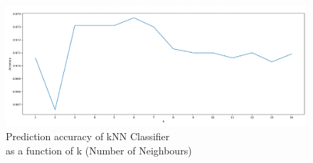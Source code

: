 \lipsum[1-1]

\begin{figure}[H]
    \centering
    \includegraphics[width=\textwidth]{images/knn.png}
    \caption*{Prediction accuracy of kNN Classifier \\
    as a function of k (Number of Neighbours)}
    \setlength{\belowcaptionskip}{-20pt}
    \setlength{\abovecaptionskip}{-20pt}
\end{figure}



